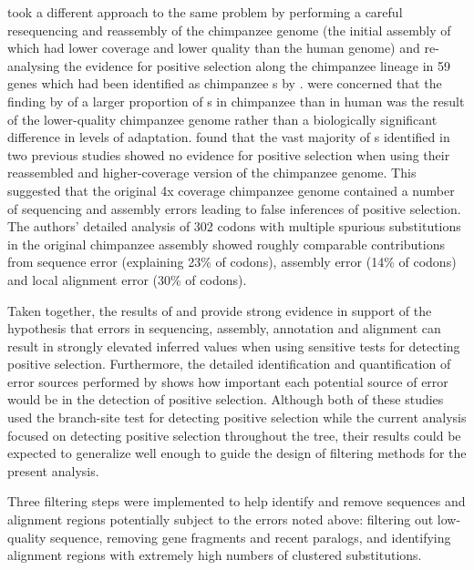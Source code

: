 \citet{Mallick2009} took a different approach to the same problem by
performing a careful resequencing and reassembly of the chimpanzee
genome (the initial assembly of which had lower coverage and lower
quality than the human genome) and re-analysing the evidence for
positive selection along the chimpanzee lineage in 59 genes which had
been identified as chimpanzee \psg{}s by
\citet{Bakewell2007}. \citet{Mallick2009} were concerned that the
finding by \citet{Bakewell2007} of a larger proportion of \psg{}s in
chimpanzee than in human was the result of the lower-quality
chimpanzee genome rather than a biologically significant difference in
levels of adaptation. \citet{Mallick2009} found that the vast majority
of \psg{}s identified in two previous studies showed no evidence for
positive selection when using their reassembled and higher-coverage
version of the chimpanzee genome. This suggested that the original 4x
coverage chimpanzee genome contained a number of sequencing and
assembly errors leading to false inferences of positive selection. The
authors' detailed analysis of 302 codons with multiple spurious \nsyn
substitutions in the original chimpanzee assembly showed roughly
comparable contributions from sequence error (explaining 23\% of
codons), assembly error (14\% of codons) and local alignment error
(30\% of codons).

Taken together, the results of \citet{Schneider2009} and
\citet{Mallick2009} provide strong evidence in support of the
hypothesis that errors in sequencing, assembly, annotation and
alignment can result in strongly elevated inferred \omg values when
using sensitive tests for detecting positive selection. Furthermore,
the detailed identification and quantification of error sources
performed by \citet{Mallick2009} shows how important each potential
source of error would be in the detection of positive
selection. Although both of these studies used the branch-site test
for detecting positive selection while the current analysis focused on
detecting \sw positive selection throughout the tree, their results
could be expected to generalize well enough to guide the design of
filtering methods for the present \sw analysis.

Three filtering steps were implemented to help identify and remove
sequences and alignment regions potentially subject to the errors
noted above: filtering out low-quality sequence, removing gene
fragments and recent paralogs, and identifying alignment regions with
extremely high numbers of clustered substitutions.

